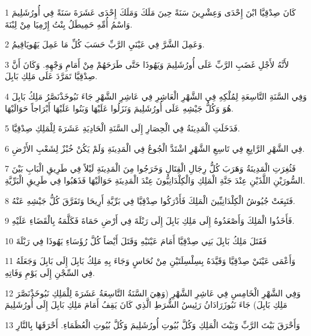 \par 1 كَانَ صِدْقِيَّا ابْنَ إِحْدَى وَعِشْرِينَ سَنَةً حِينَ مَلَكَ وَمَلَكَ إِحْدَى عَشَرَةَ سَنَةً فِي أُورُشَلِيمَ وَاسْمُ أُمِّهِ حَمِيطَلُ بِنْتُ إِرْمِيَا مِنْ لِبْنَةَ.
\par 2 وَعَمِلَ الشَّرَّ فِي عَيْنَيِ الرَّبِّ حَسَبَ كُلِّ مَا عَمِلَ يَهُويَاقِيمُ.
\par 3 لأَنَّهُ لأَجْلِ غَضَبِ الرَّبِّ عَلَى أُورُشَلِيمَ وَيَهُوذَا حَتَّى طَرَحَهُمْ مِنْ أَمَامِ وَجْهِهِ. وَكَانَ أَنَّ صِدْقِيَّا تَمَرَّدَ عَلَى مَلِكِ بَابِلَ.
\par 4 وَفِي السَّنَةِ التَّاسِعَةِ لِمُلْكِهِ فِي الشَّهْرِ الْعَاشِرِ فِي عَاشِرِ الشَّهْرِ جَاءَ نَبُوخَذْنَصَّرُ مَلِكُ بَابِلَ هُوَ وَكُلُّ جَيْشِهِ عَلَى أُورُشَلِيمَ وَنَزَلُوا عَلَيْهَا وَبَنُوا عَلَيْهَا أَبْرَاجاً حَوَالَيْهَا.
\par 5 فَدَخَلَتِ الْمَدِينَةُ فِي الْحِصَارِ إِلَى السَّنَةِ الْحَادِيَةِ عَشَرَةَ لِلْمَلِكِ صِدْقِيَّا.
\par 6 فِي الشَّهْرِ الرَّابِعِ فِي تَاسِعِ الشَّهْرِ اشْتَدَّ الْجُوعُ فِي الْمَدِينَةِ وَلَمْ يَكُنْ خُبْزٌ لِشَعْبِ الأَرْضِ.
\par 7 فَثُغِرَتِ الْمَدِينَةُ وَهَرَبَ كُلُّ رِجَالِ الْقِتَالِ وَخَرَجُوا مِنَ الْمَدِينَةِ لَيْلاً فِي طَرِيقِ الْبَابِ بَيْنَ السُّورَيْنِ اللَّذَيْنِ عِنْدَ جَنَّةِ الْمَلِكِ وَالْكِلْدَانِيُّونَ عِنْدَ الْمَدِينَةِ حَوَالَيْهَا فَذَهَبُوا فِي طَرِيقِ الْبَرِّيَّةِ.
\par 8 فَتَبِعَتْ جُيُوشُ الْكِلْدَانِيِّينَ الْمَلِكَ فَأَدْرَكُوا صِدْقِيَّا فِي بَرِّيَّةِ أَرِيحَا وَتَفَرَّقَ كُلُّ جَيْشِهِ عَنْهُ.
\par 9 فَأَخَذُوا الْمَلِكَ وَأَصْعَدُوهُ إِلَى مَلِكِ بَابِلَ إِلَى رَبْلَةَ فِي أَرْضِ حَمَاةَ فَكَلَّمَهُ بِالْقَضَاءِ عَلَيْهِ.
\par 10 فَقَتَلَ مَلِكُ بَابِلَ بَنِي صِدْقِيَّا أَمَامَ عَيْنَيْهِ وَقَتَلَ أَيْضاً كُلَّ رُؤَسَاءِ يَهُوذَا فِي رَبْلَةَ
\par 11 وَأَعْمَى عَيْنَيْ صِدْقِيَّا وَقَيَّدَهُ بِسِلْسِلَتَيْنِ مِنْ نُحَاسٍ وَجَاءَ بِهِ مَلِكُ بَابِلَ إِلَى بَابِلَ وَجَعَلَهُ فِي السِّجْنِ إِلَى يَوْمِ وَفَاتِهِ.
\par 12 وَفِي الشَّهْرِ الْخَامِسِ فِي عَاشِرِ الشَّهْرِ (وَهِيَ السَّنَةُ التَّاسِعَةُ عَشَرَةَ لِلْمَلِكِ نَبُوخَذْنَصَّرَ مَلِكِ بَابِلَ) جَاءَ نَبُوزَرَادَانُ رَئِيسُ الشُّرَطِ الَّذِي كَانَ يَقِفُ أَمَامَ مَلِكِ بَابِلَ إِلَى أُورُشَلِيمَ
\par 13 وَأَحْرَقَ بَيْتَ الرَّبِّ وَبَيْتَ الْمَلِكِ وَكُلَّ بُيُوتِ أُورُشَلِيمَ وَكُلَّ بُيُوتِ الْعُظَمَاءِ. أَحْرَقَهَا بِالنَّارِ

